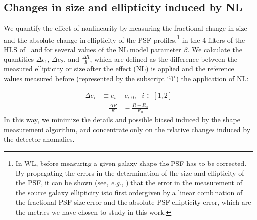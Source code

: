 \documentclass[11pt,preprint,flushrt]{aastex}
\begin{document}
\subsection{Changes in size and ellipticity induced by NL}

We quantify the effect of nonlinearity by measuring the fractional change in size and the absolute change in ellipticity of the PSF profiles,\footnote{In WL, before measuring a given galaxy shape the PSF has to be corrected. By propagating the errors in the determination of the size and ellipticity of the PSF, it can be shown (see, \emph{e.g.}, \citealt{paulin08}) that the error in the measurement of the source galaxy ellipticity is\textemdash to first order\textemdash given by a linear combination of the fractional PSF size error and the absolute PSF ellipticity error, which are the metrics we have chosen to study in this work.} in the 4 filters of the HLS of \wfa\, and for several values of the NL model parameter $\beta$. We calculate the quantities $\Delta e_1$, $\Delta e_2$, and $\frac{\Delta R}{R}$, which are defined as the difference between the measured ellipticity or size after the effect (NL) is applied and the reference values measured before (represented by the subscript ``$0$") the application of NL:

\begin{align}
\Delta e_{i} &\equiv e_{i} - e_{i,0},\ \ \ i\in[1,2]  
\label{delta_e}
\end{align}
\begin{align}
\frac{\Delta R}{R} &\equiv \frac {{R} - R_{0}}  { R_{0}}
\label{delta_r}
\end{align}
In this way, we minimize the details and possible biased induced by the shape measurement algorithm, and concentrate only on the relative changes induced by the detector anomalies. 
\end{document}
